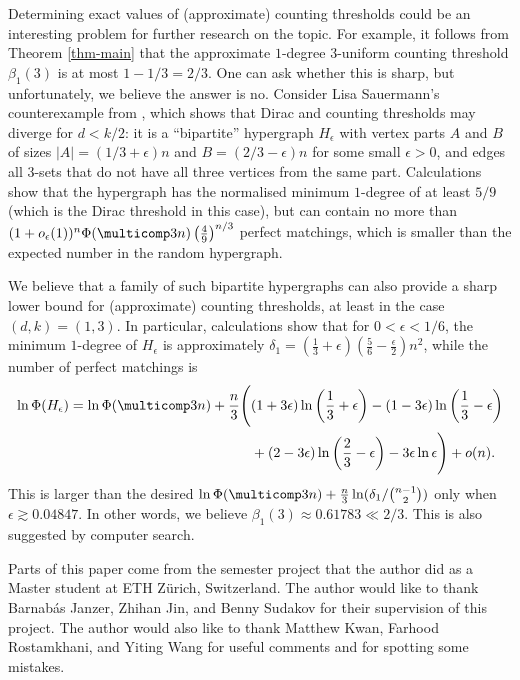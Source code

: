 \documentclass[11pt]{article}
\begin{document}
Determining exact values of (approximate) counting thresholds could be an interesting problem for further research on the topic. For example, it follows from Theorem \ref{thm-main} that the approximate $1$-degree $3$-uniform counting threshold $\beta_1(3)$ is at most $1-1/3=2/3$. One can ask whether this is sharp, but unfortunately, we believe the answer is no. Consider Lisa Sauermann's counterexample from \cite[Section 5]{ferber2023counting}, which shows that Dirac and counting thresholds may diverge for $d<k/2$: it is a ``bipartite'' hypergraph $H_{\epsilon}$ with vertex parts $A$ and $B$ of sizes $|A|=(1/3+\epsilon)n$ and $B=(2/3-\epsilon)n$ for some small $\epsilon>0$, and edges all $3$-sets that do not have all three vertices from the same part. Calculations show that the hypergraph has the normalised minimum $1$-degree of at least $5/9$ (which is the Dirac threshold in this case), but can contain no more than $(1+o_{\epsilon}(1))^n\Phi(\multicomp 3n)\left(\frac{4}{9}\right)^{n/3}$ perfect matchings, which is smaller than the expected number in the random hypergraph.

We believe that a family of such bipartite hypergraphs can also provide a sharp lower bound for (approximate) counting thresholds, at least in the case $(d,k)=(1,3)$. In particular, calculations show that for $0<\epsilon<1/6$, the minimum $1$-degree of $H_{\epsilon}$ is approximately $\delta_1=(\frac{1}{3}+\epsilon)(\frac{5}{6}-\frac{\epsilon}{2})n^2$, while the number of perfect matchings is
\begin{align*}
    \ln\Phi(H_{\epsilon})=\ln\Phi(\multicomp 3n) + \frac{n}{3}\Bigg(&(1+3\epsilon)\ln\left(\frac{1}{3}+\epsilon\right) - (1-3\epsilon)\ln\left(\frac{1}{3}-\epsilon\right) \\
    &+ (2-3\epsilon)\ln\left(\frac{2}{3}-\epsilon\right) - 3\epsilon\ln\epsilon\Bigg) + o(n).
\end{align*}
This is larger than the desired $\ln\Phi(\multicomp 3n)+\frac{n }{3}\ln(\delta_1/\binom{n-1}{2})$ only when $\epsilon\gtrsim 0.04847$. In other words, we believe $\beta_1(3)\approx 0.61783\ll2/3$. This is also suggested by computer search.

\begin{acknowledgements}
    Parts of this paper come from the semester project that the author did as a Master student at ETH Z\"urich, Switzerland. The author would like to thank Barnab\'as Janzer, Zhihan Jin, and Benny Sudakov for their supervision of this project. The author would also like to thank Matthew Kwan, Farhood Rostamkhani, and Yiting Wang for useful comments and for spotting some mistakes.
\end{acknowledgements}
\end{document}
